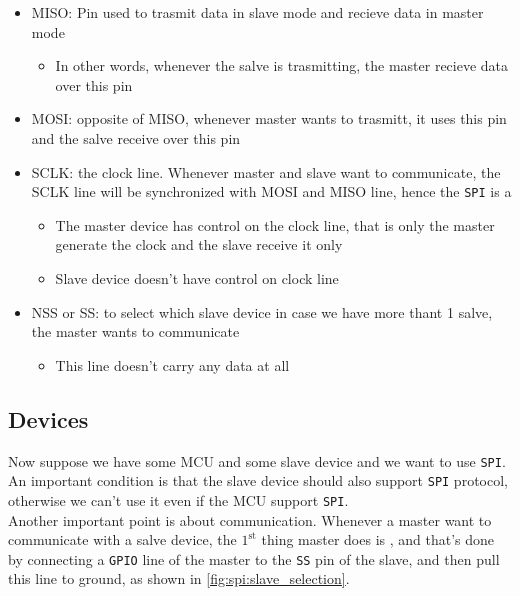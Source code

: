 \begin{itemize}

\item MISO: Pin used to trasmit data in slave mode and recieve data in master mode

	\begin{itemize}
	\item In other words, whenever the salve is trasmitting, the master recieve data over this pin
	\end{itemize}

\item MOSI: opposite of MISO, whenever master wants to trasmitt, it uses this pin and the salve receive over this pin

\item SCLK: the clock line. Whenever master and slave want to communicate, the SCLK line will be synchronized with MOSI and MISO line, hence the \verb|SPI| is a 

	\begin{itemize}
	\item The master device has control on the clock line, that is only the master generate the clock and the slave receive it only
	
	\item Slave device doesn't have control on clock line
	\end{itemize}


\item NSS or SS: to select which slave device in case we have more thant 1 salve, the master wants to communicate

	\begin{itemize}
	\item This line doesn't carry any data at all
	\end{itemize}

\end{itemize}

\subsection{Devices}

Now suppose we have some MCU and some slave device and we want to use \verb|SPI|. An important condition is that the slave device should also support \verb|SPI| protocol, otherwise we can't use it even if the MCU support \verb|SPI|.\\

Another important point is about communication. Whenever a master want to communicate with a salve device, the $\mathrm{1}^\mathrm{st}$ thing master does is , and that's done by connecting a \verb|GPIO| line of the master to the \verb|SS| pin of the slave, and then pull this line to ground, as shown in \autoref{fig:spi:slave_selection}.


